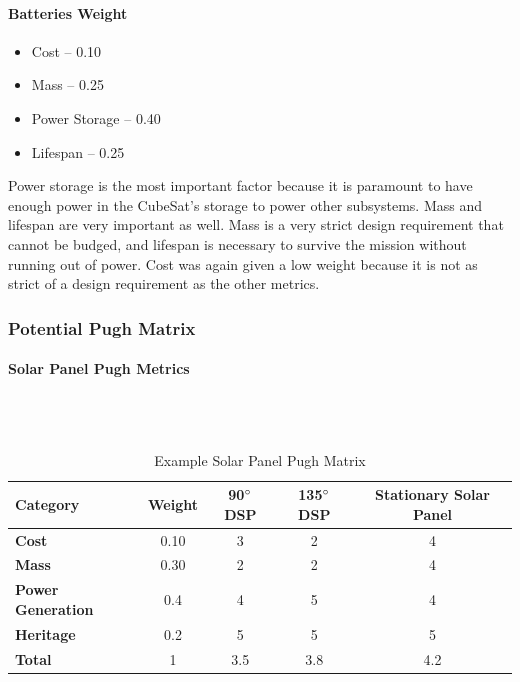 \paragraph{Batteries Weight}
\begin{itemize}
    \item Cost – 0.10
    \item Mass – 0.25
    \item Power Storage – 0.40
    \item Lifespan – 0.25
\end{itemize}    
Power storage is the most important factor because it is paramount to have enough power in the CubeSat's storage to power other subsystems.  Mass and lifespan are very important as well.  Mass is a very strict design requirement that cannot be budged, and lifespan is necessary to survive the mission without running out of power. Cost was again given a low weight because it is not as strict of a design requirement as the other metrics.
\subsubsection{Potential Pugh Matrix}
\paragraph{Solar Panel Pugh Metrics} ~\\ ~\\
\begin{table}[H]
\centering
\begin{tabular}{|l|c|c|c|c|} 
\hline
    \textbf{Category} & \textbf{Weight} & \textbf{90$\degree$ DSP} & \textbf{135$\degree$ DSP} & \textbf{Stationary Solar Panel}
    \\
\hline
    \textbf{Cost} & 0.10 & 3 & 2 & 4
    \\
\hline
    \textbf{Mass} & 0.30 & 2 & 2 & 4
    \\
\hline
    \textbf{Power Generation} & 0.4 & 4 & 5 & 4
    \\
\hline
    \textbf{Heritage} & 0.2 & 5 & 5 & 5
    \\
\hline
    \textbf{Total} & 1 & 3.5 & 3.8 & 4.2
    \\
\hline
\end{tabular}
\caption{Example Solar Panel Pugh Matrix }
\label{tbl:SolarPanel_Pugh}
\end{table}
